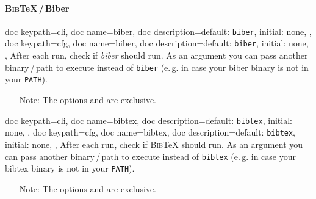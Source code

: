 \documentclass[a4paper, 11pt]{scrartcl}
\newcommand\eg{e.\,g.\xspace}
\let\TeXold\TeX
\providecommand\BibTeX{\textsc{Bib}\TeX\xspace}
\renewcommand\TeX{\TeXold\xspace}
\begin{document}
\paragraph{\BibTeX\,/\,Biber}
\begin{docKeys}[
		doc parameter={=\meta{biber}},
	]{
		{
			doc keypath=cli,
			doc name=biber,
			doc description={default: \texttt{biber}, initial: none},
		},
		{
			doc keypath=cfg,
			doc name=biber,
			doc description={default: \texttt{biber}, initial: none},
		},
	}
	After each run, check if \emph{biber} should run.
	As an argument  you can pass another binary\,/\,path to execute instead of \texttt{biber} (\eg in case your biber binary is not in your \texttt{PATH}).

	\begin{itemize}
		\item[Note:] The options  and  are exclusive.
	\end{itemize}
\end{docKeys}
\begin{docKeys}[
		doc parameter={=\meta{bibtex}},
	]{
		{
			doc keypath=cli,
			doc name=bibtex,
			doc description={default: \texttt{bibtex}, initial: none},
		},
		{
			doc keypath=cfg,
			doc name=bibtex,
			doc description={default: \texttt{bibtex}, initial: none},
		},
	}
	After each run, check if \BibTeX should run.
	As an argument  you can pass another binary\,/\,path to execute instead of \texttt{bibtex} (\eg in case your bibtex binary is not in your \texttt{PATH}).

	\begin{itemize}
		\item[Note:] The options  and  are exclusive.
	\end{itemize}
\end{docKeys}
\end{document}
